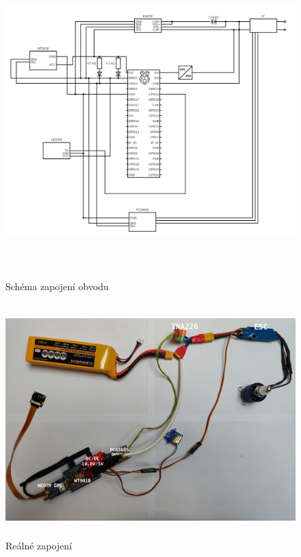 \documentclass[a4paper,oneside,12pt]{report}
\begin{document}
\begin{figure}[h]
  \centering
  \includegraphics[height=12cm]{../img/schema.png}
  \caption[Schéma zapojení obvodu]{Schéma zapojení obvodu}
\end{figure}

\newpage

\begin{figure}[h]
  \centering
  \includegraphics[height=9cm]{../img/circuit.jpg}
  \caption[Reálné zapojení]{Reálné zapojení\footnotemark}
\end{figure}
\end{document}
